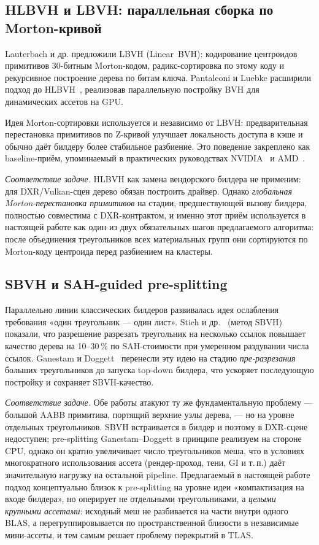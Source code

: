 \subsection{HLBVH и LBVH: параллельная сборка по Morton-кривой}

Lauterbach и др. предложили LBVH (Linear~BVH): кодирование
центроидов примитивов 30-битным Morton-кодом, радикс-сортировка по
этому коду и рекурсивное построение дерева по битам ключа.
Pantaleoni и Luebke расширили подход до HLBVH~\cite{HLBVH},
реализовав параллельную постройку BVH для динамических ассетов
на GPU.

Идея Morton-сортировки используется и независимо от LBVH:
предварительная перестановка примитивов по Z-кривой
улучшает локальность
доступа в кэше и обычно даёт билдеру более стабильное разбиение. Это поведение закреплено как baseline-приём,
упоминаемый в практических руководствах
NVIDIA~\cite{nvOptMesh} и AMD~\cite{rraManual}.

\textit{Соответствие задаче.} HLBVH как замена вендорского билдера
не применим: для DXR/Vulkan-сцен дерево обязан построить драйвер.
Однако \emph{глобальная Morton-перестановка примитивов} на стадии,
предшествующей вызову билдера, полностью совместима с
DXR-контрактом, и именно этот приём используется в
настоящей работе как один из двух обязательных шагов
предлагаемого алгоритма: после
объединения треугольников всех материальных групп они
сортируются по Morton-коду центроида перед разбиением на
кластеры.

\subsection{SBVH и SAH-guided pre-splitting}

Параллельно линии классических билдеров развивалась идея ослабления
требования «один треугольник --- один лист». Stich и
др.~\cite{stich2009} (метод SBVH) показали, что разрешение
разрезать треугольник на несколько ссылок
повышает качество дерева на 10--30\,\% по SAH-стоимости при
умеренном раздувании числа ссылок. Ganestam и
Doggett~\cite{ganestam16_splitting} перенесли эту идею на стадию
\emph{пре-разрезания} больших треугольников до запуска top-down
билдера, что ускоряет последующую постройку и сохраняет
SBVH-качество.

\textit{Соответствие задаче.} Обе работы атакуют ту же
фундаментальную проблему --- большой AABB примитива, портящий
верхние узлы дерева, --- но на уровне отдельных треугольников. SBVH
встраивается в билдер и поэтому в DXR-сцене недоступен;
pre-splitting Ganestam--Doggett в принципе реализуем на стороне
CPU, однако он кратно увеличивает число треугольников меша, что в
условиях многократного использования ассета (рендер-проход, тени,
GI и т.\,п.) даёт значительную нагрузку на остальной pipeline.
Предлагаемый в настоящей работе подход концептуально близок к
pre-splitting на уровне идеи «компактизация на входе билдера», но
оперирует не отдельными треугольниками, а \emph{целыми крупными ассетами}:
исходный меш не разбивается на части внутри одного BLAS, а перегруппировывается
по пространственной близости в независимые мини-ассеты, и тем самым решает проблему перекрытий в TLAS.


